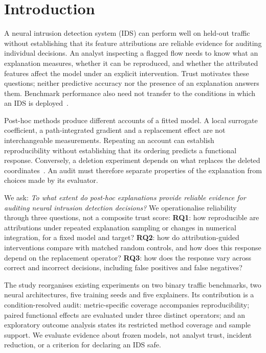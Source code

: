 \section{Introduction}

A neural intrusion detection system (IDS) can perform well on held-out traffic
without establishing that its feature attributions are reliable evidence for
auditing individual decisions. An analyst inspecting a flagged flow needs to
know what an explanation measures, whether it can be reproduced, and whether
the attributed features affect the model under an explicit intervention.
Trust motivates these questions; neither predictive accuracy nor the presence
of an explanation answers them. Benchmark performance also need not transfer
to the conditions in which an IDS is deployed~\cite{sommer2010outside}.

Post-hoc methods produce different accounts of a fitted model. A local
surrogate coefficient, a path-integrated gradient and a replacement effect
are not interchangeable measurements. Repeating an account can establish
reproducibility without establishing that its ordering predicts a functional
response. Conversely, a deletion experiment depends on what replaces the
deleted coordinates~\cite{rong2022road,wang2024deletion}. An audit must therefore
separate properties of the explanation from choices made by its evaluator.

We ask: \emph{To what extent do post-hoc explanations provide reliable evidence
for auditing neural intrusion detection decisions?} We operationalise reliability
through three questions, not a composite trust score:
\textbf{RQ1}: how reproducible are attributions under repeated explanation
sampling or changes in numerical integration, for a fixed model and target?
\textbf{RQ2}: how do attribution-guided interventions compare with matched
random controls, and how does this response depend on the replacement operator?
\textbf{RQ3}: how does the response vary across correct and incorrect decisions,
including false positives and false negatives?

The study reorganises existing experiments on two binary traffic benchmarks,
two neural architectures, five training seeds and five explainers. Its
contribution is a condition-resolved audit: metric-specific coverage accompanies
reproducibility; paired functional effects are evaluated under three distinct
operators; and an exploratory outcome analysis states its restricted method
coverage and sample support. We evaluate evidence about frozen models, not
analyst trust, incident reduction, or a criterion for declaring an IDS safe.
